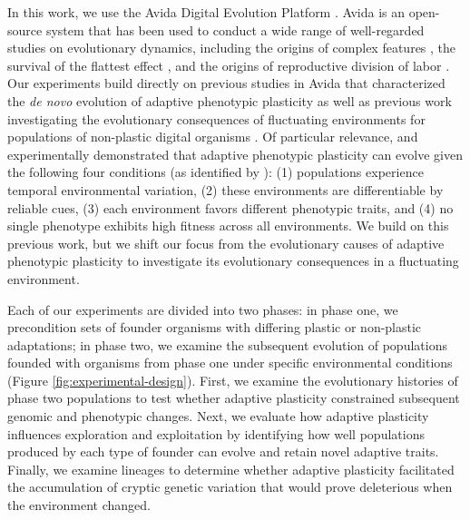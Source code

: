 In this work, we use the Avida Digital Evolution Platform \citep{ofria_avida:_2009}.
Avida is an open-source system that has been used to conduct a wide range of well-regarded studies on evolutionary dynamics, including 
the origins of complex features \citep{lenski_evolutionary_2003},
the survival of the flattest effect \citep{wilke_evolution_2001},
and the origins of reproductive division of labor \citep{goldsby_evolutionary_2014}.
Our experiments build directly on previous studies in Avida that characterized the \textit{de novo} evolution of adaptive phenotypic plasticity \citep{clune_investigating_2007,lalejini_evolutionary_2016} as well as previous work investigating the evolutionary consequences of fluctuating environments for populations of non-plastic digital organisms \citep{li_digital_2004,canino-koning_fluctuating_2019}.
Of particular relevance, \cite{clune_investigating_2007} and \cite{lalejini_evolutionary_2016} experimentally demonstrated that adaptive phenotypic plasticity can evolve given the following four conditions (as identified by \citealt{ghalambor_behavior_2010}):
(1) populations experience temporal environmental variation,
(2) these environments are differentiable by reliable cues,
(3) each environment favors different phenotypic traits,
and (4) no single phenotype exhibits high fitness across all environments.
We build on this previous work, but we shift our focus from the evolutionary causes of adaptive phenotypic plasticity to investigate its evolutionary consequences in a fluctuating environment.


Each of our experiments are divided into two phases: in phase one, we precondition sets of founder organisms with differing plastic or non-plastic adaptations;
in phase two, we examine the subsequent evolution of populations founded with organisms from phase one under specific environmental conditions (Figure \ref{fig:experimental-design}).
First, we examine the evolutionary histories of phase two populations to test whether adaptive plasticity constrained subsequent genomic and phenotypic changes. 
Next, we evaluate how adaptive plasticity influences exploration and exploitation by identifying how well populations produced by each type of founder can evolve and retain novel adaptive traits.
Finally, we examine lineages to determine whether adaptive plasticity facilitated the accumulation of cryptic genetic variation that would prove deleterious when the environment changed. 

